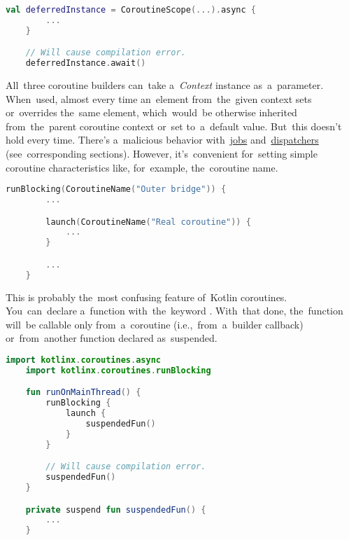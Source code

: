 \begin{lstlisting}[language=Kotlin]
    val deferredInstance = CoroutineScope(...).async {
        ...
    }

    // Will cause compilation error.
    deferredInstance.await()
\end{lstlisting}

\warning All~three coroutine builders can~take \mbox{a \textit{Context}} instance as~a~parameter.
When~used, almost every time an~element from~the~given context sets or~overrides the~same element, which~would~be otherwise inherited from~the~parent coroutine context or~set to~a~default value.
But~this doesn't hold every time.
There's a~malicious behavior with~\hyperref[kotlincoroutinejob]{jobs} and~\hyperref[kotlincoroutinedispatcher]{dispatchers} (see~corresponding sections).
However, it's~convenient for~setting simple coroutine characteristics like, for~example, the~coroutine name.

\begin{lstlisting}[language=Kotlin]
    runBlocking(CoroutineName("Outer bridge")) {
        ...

        launch(CoroutineName("Real coroutine")) {
            ...
        }

        ...
    }
\end{lstlisting}

\label{kotlinsuspendfunction}
This is probably the~most confusing feature of~Kotlin coroutines.
You~can~declare a~function with~the~keyword .
With~that done, the~function will~be callable only from~a~coroutine (i.e.,~from~a~builder callback) or~from~another function declared as~suspended.

\begin{lstlisting}[language=Kotlin]
    import kotlinx.coroutines.async
    import kotlinx.coroutines.runBlocking

    fun runOnMainThread() {
        runBlocking {
            launch {
                suspendedFun()
            }
        }

        // Will cause compilation error.
        suspendedFun()
    }

    private suspend fun suspendedFun() {
        ...
    }
\end{lstlisting}
\newline

